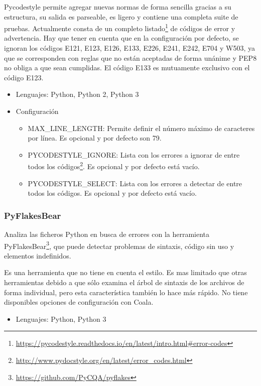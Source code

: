 \documentclass[a4paper, 12pt]{book}
\begin{document}
Pycodestyle permite agregar nuevas normas de forma sencilla gracias a su estructura, su salida es parseable, es ligero y contiene una completa suite de pruebas. Actualmente consta de un completo listado\footnote{\url{https://pycodestyle.readthedocs.io/en/latest/intro.html#error-codes}} de códigos de error y advertencia. Hay que tener en cuenta que en la configuración por defecto, se ignoran los códigos E121, E123, E126, E133, E226, E241, E242, E704 y W503, ya que se corresponden con reglas que no están aceptadas de forma unánime y PEP8 no obliga a que sean cumplidas. El código E133 es mutuamente exclusivo con el código E123.

\begin{itemize}
  \item Lenguajes: Python, Python 2, Python 3
  \item Configuración
    \begin{itemize}
          \item MAX\_LINE\_LENGTH: Permite definir el número máximo de caracteres por línea. Es opcional y por defecto son 79.
          \item PYCODESTYLE\_IGNORE: Lista con los errores a ignorar de entre todos los códigos\footnote{\url{http://www.pydocstyle.org/en/latest/error_codes.html}}. Es opcional y por defecto está vacío.
          \item PYCODESTYLE\_SELECT: Lista con los errores a detectar de entre todos los códigos. Es opcional y por defecto está vacío.
    \end{itemize}
\end{itemize}

\subsubsection{PyFlakesBear}
\label{sec:seccion1.2.8}
Analiza las ficheros Python en busca de errores con la herramienta PyFlakesBear\footnote{\url{https://github.com/PyCQA/pyflakes}}, que puede detectar problemas de sintaxis, código sin uso y elementos indefinidos.

Es una herramienta que no tiene en cuenta el estilo. Es mas limitado que otras herramientas debido a que sólo examina el árbol de sintaxis de los archivos de forma individual, pero esta característica también lo hace más rápido. No tiene disponibles opciones de configuración con Coala.

\begin{itemize}
  \item Lenguajes: Python, Python 3
\end{itemize}
\end{document}
